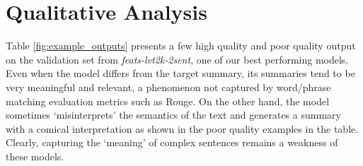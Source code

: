\section{Qualitative Analysis}\label{sec:analysis}

Table \ref{fig:example_outputs} presents a few high quality and poor quality output on the validation set from {\it feats-lvt2k-2sent}, one of our best performing models. Even when the model differs from the target summary, its summaries tend to be very meaningful and relevant, a phenomenon not captured by word/phrase matching evaluation metrics such as Rouge. On the other hand, the model sometimes `misinterprets' the semantics of the text and generates a summary with a comical interpretation as shown in the poor quality examples in the table. Clearly, capturing the `meaning' of complex sentences remains a weakness of these models.


